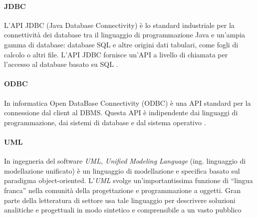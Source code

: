 \paragraph{JDBC}
\label{JDBC}
L'API JDBC (Java Database Connectivity) è lo standard industriale per la connettività dei database tra il linguaggio di programmazione Java e un'ampia gamma di database: database SQL e altre origini dati tabulari, come fogli di calcolo o altri file. L'API JDBC fornisce un'API a livello di chiamata per l'accesso al database basato su SQL \cite{[26]}.

\paragraph{ODBC}
\label{ODBC}
In informatica Open DataBase Connectivity (ODBC) è una API standard per la connessione dal client al DBMS. Questa API è indipendente dai linguaggi di programmazione, dai sistemi di database e dal sistema operativo \cite{[27]}.

\paragraph{UML} 
\label{UMLl} 
In ingegneria del software \emph{UML, Unified Modeling Language} (ing. linguaggio di modellazione unificato) è un linguaggio di modellazione e specifica basato sul paradigma object-oriented. L'\emph{UML} svolge un'importantissima funzione di ``lingua franca'' nella comunità della progettazione e programmazione a oggetti. Gran parte della letteratura di settore usa tale linguaggio per descrivere soluzioni analitiche e progettuali in modo sintetico e comprensibile a un vasto pubblico


